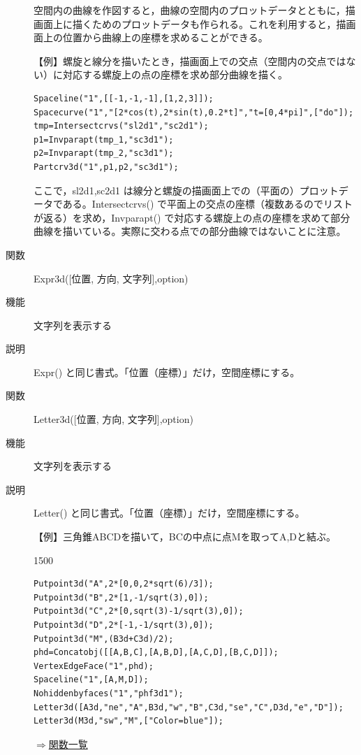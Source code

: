 \documentclass[papersize,a4paper,12pt,uplatex]{jsarticle}
\begin{document}
\begin{description}
空間内の曲線を作図すると，曲線の空間内のプロットデータとともに，描画面上に描くためのプロットデータも作られる。これを利用すると，描画面上の位置から曲線上の座標を求めることができる。

\vspace{\baselineskip}
【例】螺旋と線分を描いたとき，描画面上での交点（空間内の交点ではない）に対応する螺旋上の点の座標を求め部分曲線を描く。

\begin{verbatim}
Spaceline("1",[[-1,-1,-1],[1,2,3]]);
Spacecurve("1","[2*cos(t),2*sin(t),0.2*t]","t=[0,4*pi]",["do"]);
tmp=Intersectcrvs("sl2d1","sc2d1");
p1=Invparapt(tmp_1,"sc3d1");
p2=Invparapt(tmp_2,"sc3d1");
Partcrv3d("1",p1,p2,"sc3d1"); 
\end{verbatim}
 \begin{center}\scalebox{0.8}{ } \end{center}
 
ここで，sl2d1,sc2d1 は線分と螺旋の描画面上での（平面の）プロットデータである。Intersectcrvs() で平面上の交点の座標（複数あるのでリストが返る）を求め，Invparapt() で対応する螺旋上の点の座標を求めて部分曲線を描いている。実際に交わる点での部分曲線ではないことに注意。
\vspace{\baselineskip}
\hypertarget{expr3d}{}
\item[関数]Expr3d([位置, 方向, 文字列],option)
\item[機能]文字列を表示する
\item[説明]Expr() と同じ書式。「位置（座標）」だけ，空間座標にする。

\vspace{\baselineskip}
\hypertarget{letter3d}{}
\item[関数]Letter3d([位置, 方向, 文字列],option)
\item[機能]文字列を表示する
\item[説明]Letter() と同じ書式。「位置（座標）」だけ，空間座標にする。

\vspace{\baselineskip}
【例】三角錐ABCDを描いて，BCの中点に点Mを取ってA,Dと結ぶ。

\begin{layer}{150}{0}
\end{layer}
\begin{verbatim}
Putpoint3d("A",2*[0,0,2*sqrt(6)/3]);
Putpoint3d("B",2*[1,-1/sqrt(3),0]);
Putpoint3d("C",2*[0,sqrt(3)-1/sqrt(3),0]);
Putpoint3d("D",2*[-1,-1/sqrt(3),0]);
Putpoint3d("M",(B3d+C3d)/2);
phd=Concatobj([[A,B,C],[A,B,D],[A,C,D],[B,C,D]]);
VertexEdgeFace("1",phd);
Spaceline("1",[A,M,D]);
Nohiddenbyfaces("1","phf3d1");
Letter3d([A3d,"ne","A",B3d,"w","B",C3d,"se","C",D3d,"e","D"]);
Letter3d(M3d,"sw","M",["Color=blue"]);
\end{verbatim}
\begin{flushright} \hyperlink{functionlist}{$\Rightarrow$関数一覧}\end{flushright}



\end{description}
\end{document}
